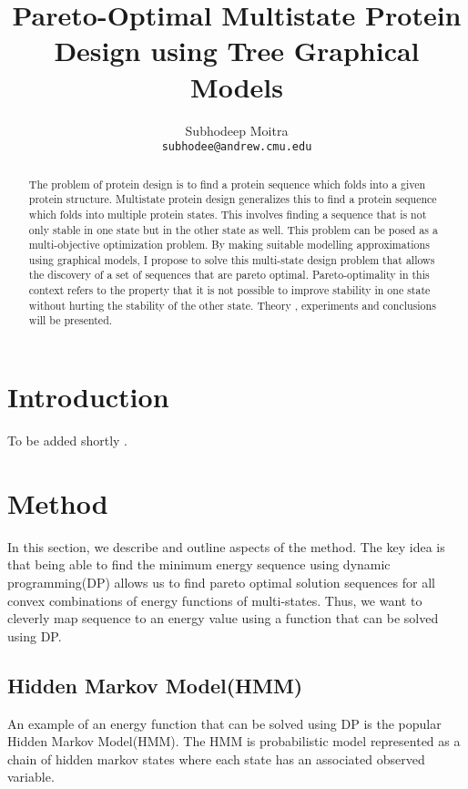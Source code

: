 \documentclass{article}
\begin{document}
\title{Pareto-Optimal Multistate Protein Design using Tree Graphical Models}
\author{Subhodeep Moitra \\ {\tt subhodee@andrew.cmu.edu}}

\maketitle

\begin{abstract}
The problem of protein design is to find a protein sequence which folds into a given protein structure. Multistate protein design generalizes this to find a protein sequence which folds into multiple protein states. This involves finding a sequence that is not only stable in one state but in the other state as well. This problem can be posed as a multi-objective optimization problem. By making suitable modelling approximations using graphical models, I propose to solve this multi-state design problem that allows the discovery of a set of sequences that are pareto optimal. Pareto-optimality in this context refers to the property that it is not possible to improve stability in one state without hurting the stability of the other state. Theory  , experiments and conclusions will be presented. 
\end{abstract}

\clearpage
\newpage

\section{Introduction}
To be added shortly \cite{Ambroggio2006}.

\section{Method}
In this section, we describe and outline aspects of the method. The key idea is that being able to find the minimum energy sequence using dynamic programming(DP) allows us to find pareto optimal solution sequences for all convex combinations of energy functions of multi-states. Thus, we want to cleverly map sequence to an energy value using a function that can be solved using DP.

\subsection{Hidden Markov Model(HMM)}
An example of an energy function that can be solved using DP is the popular Hidden Markov Model(HMM). The HMM is probabilistic model represented as a chain of hidden markov states where each state has an associated observed variable. 
\end{document}
